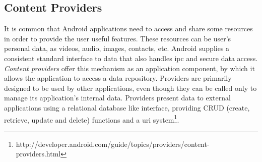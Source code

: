 \subsection{Content Providers}

It is common that Android applications need to access and share some resources in order to provide the user useful features. These resources can be user's personal data, as videos, audio, images, contacts, etc. Android supplies a consistent standard interface to data that also handles \gls{ipc} and secure data access. \textit{Content providers} offer this mechanism as an application component, by which it allows the application to access a data repository. Providers are primarily designed to be used by other applications, even though they can be called only to manage its application's internal data. Providers present data to external applications using a relational database like interface, providing CRUD (create, retrieve, update and delete) functions and a \gls{uri} system\footnote{http://developer.android.com/guide/topics/providers/content-providers.html}.
